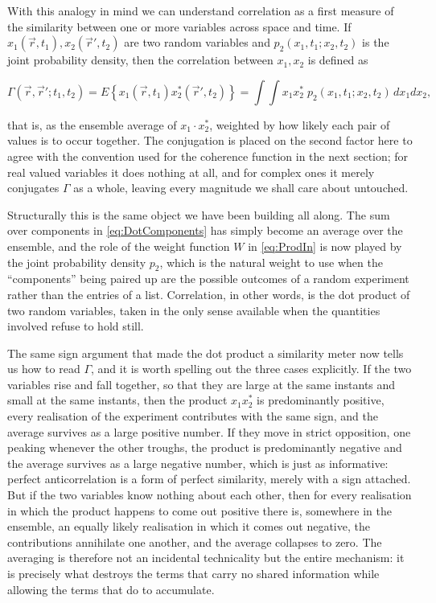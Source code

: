 	With this analogy in mind we can understand correlation as a first measure of the
	similarity between one or more variables across space and time. If $x_1(\vec{r},t_1),
	x_2(\vec{r}',t_2)$ are two random variables and $p_2(x_1,t_1;x_2,t_2)$ is the joint
	probability density, then the correlation between $x_1,x_2$ is defined as

	\begin{equation}\label{eq:CorrFunc}
		\Gamma(\vec{r},\vec{r}';t_1,t_2) = E\left\{ x_1(\vec{r},t_1) x_2^*(\vec{r}',t_2)\right\}
		= \int\!\!\int x_1 x_2^* \; p_2(x_1,t_1;x_2,t_2)\, dx_1 dx_2,
	\end{equation}

	that is, as the ensemble average of $x_1\cdot x_2^*$, weighted by how likely each pair of
	values is to occur together. The conjugation is placed on the second factor here to agree
	with the convention used for the coherence function in the next section; for real valued
	variables it does nothing at all, and for complex ones it merely conjugates $\Gamma$ as a
	whole, leaving every magnitude we shall care about untouched.

	Structurally this is the same object we have been building all along. The sum over
	components in \eqref{eq:DotComponents} has simply become an average over the ensemble, and
	the role of the weight function $W$ in \eqref{eq:ProdIn} is now played by the joint
	probability density $p_2$, which is the natural weight to use when the ``components'' being
	paired up are the possible outcomes of a random experiment rather than the entries of a
	list. Correlation, in other words, is the dot product of two random variables, taken in the
	only sense available when the quantities involved refuse to hold still.

	The same sign argument that made the dot product a similarity meter now tells us how to read
	$\Gamma$, and it is worth spelling out the three cases explicitly. If the two variables rise
	and fall together, so that they are large at the same instants and small at the same
	instants, then the product $x_1 x_2^*$ is predominantly positive, every realisation of the
	experiment contributes with the same sign, and the average survives as a large positive
	number. If they move in strict opposition, one peaking whenever the other troughs, the
	product is predominantly negative and the average survives as a large negative number, which
	is just as informative: perfect anticorrelation is a form of perfect similarity, merely with
	a sign attached. But if the two variables know nothing about each other, then for every
	realisation in which the product happens to come out positive there is, somewhere in the
	ensemble, an equally likely realisation in which it comes out negative, the contributions
	annihilate one another, and the average collapses to zero. The averaging is
	therefore not an incidental technicality but the entire mechanism: it is precisely what
	destroys the terms that carry no shared information while allowing the terms that do to
	accumulate.


